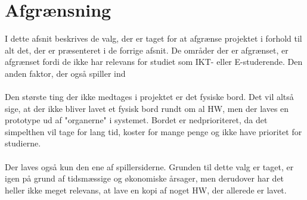 \documentclass[Rapport/Rapport_main.tex]{subfiles}
\begin{document}
\section{Afgrænsning}\label{sec:afgraensning}
I dette afsnit beskrives de valg, der er taget for at afgrænse projektet i forhold til alt det, der er præsenteret i de forrige afsnit. De områder der er afgrænset, er afgrænset fordi de ikke har relevans for studiet som  IKT- eller E-studerende. Den anden faktor, der også spiller ind \\\\
Den største ting der ikke medtages i projektet er det fysiske bord. Det vil altså sige, at der ikke bliver lavet et fysisk bord rundt om al HW, men der laves en prototype ud af "organerne" i systemet. Bordet er nedprioriteret, da det simpelthen vil tage for lang tid, koster for mange penge og ikke have prioritet for studierne.\\\\
Der laves også kun den ene af spillersiderne. Grunden til dette valg er taget, er igen på grund af tidsmæssige og økonomiske årsager, men derudover har det heller ikke meget relevans, at lave en kopi af noget HW, der allerede er lavet.
\end{document}
